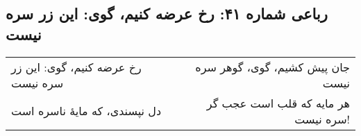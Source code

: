 \begin{center}
\section*{رباعی شماره ۴۱: رخ عرضه کنیم، گوی: این زر سره نیست}
\label{sec:041}
\begin{longtable}{l p{0.5cm} r}
رخ عرضه کنیم، گوی: این زر سره نیست
&&
جان پیش کشیم، گوی، گوهر سره نیست
\\
دل نپسندی، که مایهٔ ناسره است
&&
هر مایه که قلب است عجب گر سره نیست!
\\
\end{longtable}
\end{center}
